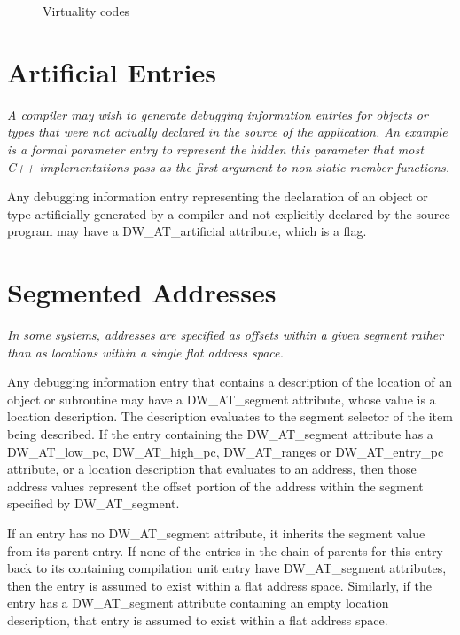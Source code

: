 \begin{figure}[here]
\begin{description}
\centering
\item [DW\-\_VIRTUALITY\-\_none]
\item [DW\-\_VIRTUALITY\-\_virtual]
\item [DW\-\_VIRTUALITY\-\_pure\-\_virtual]
\end{description}
\caption{Virtuality codes}
\label{fig:virtualitycodes}
\end{figure}

\section{Artificial Entries}
\label{chap:artificialentries}
\textit{A compiler may wish to generate debugging information entries
for objects or types that were not actually declared in the
source of the application. An example is a formal parameter
entry to represent the hidden this parameter that most C++
implementations pass as the first argument to non-static member
functions.}  

Any debugging information entry representing the
declaration of an object or type artificially generated by
a compiler and not explicitly declared by the source program
may have a DW\-\_AT\-\_artificial attribute, which is a flag.

\section{Segmented Addresses}
\label{chap:segmentedaddresses}
\textit{In some systems, addresses are specified as offsets within a
given segment rather than as locations within a single flat
address space.}

Any debugging information entry that contains a description
of the location of an object or subroutine may have
a DW\-\_AT\-\_segment attribute, whose value is a location
description. The description evaluates to the segment selector
of the item being described. If the entry containing the
DW\-\_AT\-\_segment attribute has a DW\-\_AT\-\_low\-\_pc, DW\-\_AT\-\_high\-\_pc,
DW\-\_AT\-\_ranges or DW\-\_AT\-\_entry\-\_pc attribute, or a location
description that evaluates to an address, then those address
values represent the offset portion of the address within
the segment specified by DW\-\_AT\-\_segment.

If an entry has no DW\-\_AT\-\_segment attribute, it inherits
the segment value from its parent entry.  If none of the
entries in the chain of parents for this entry back to
its containing compilation unit entry have DW\-\_AT\-\_segment
attributes, then the entry is assumed to exist within a flat
address space. Similarly, if the entry has a DW\-\_AT\-\_segment
attribute containing an empty location description, that
entry is assumed to exist within a flat address space.

